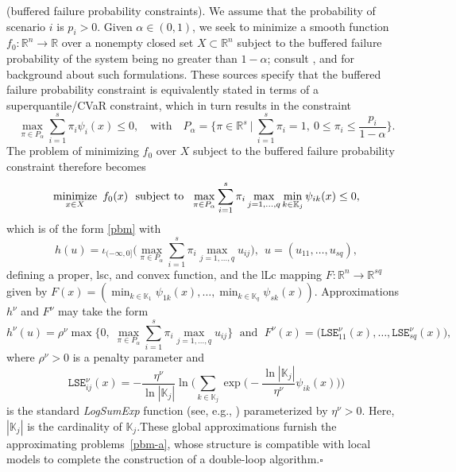 \documentclass[smallextended,envcountsect]{svjour3}
\renewcommand{\Re}{\mathbb{R}}
\newcommand{\mybox}{{\hfill $\square$}}
\newcommand{\reals}{\mathbb{R}}
\newcommand{\nnmin}{\mathop{\rm minimize}}
\begin{document}
\begin{example}{\rm (buffered failure probability constraints).}
We assume that the probability of scenario $i$ is $p_i>0$. Given $\alpha \in (0,1)$, we seek to minimize a smooth function $f_0:\reals^{n}\to \reals$ over a nonempty closed set $X\subset \reals^{n}$ subject to the buffered failure probability of the system being no greater than $1-\alpha$; consult \cite{RockafellarRoyset.10,Royset2025}, and \cite[\S\, 3.E]{Royset_Wets_2021} for background about such formulations. These sources specify that the buffered failure probability constraint is equivalently stated in terms of a superquantile/CVaR constraint, which in turn results in the constraint 
\[
\max_{\pi \in P_\alpha}  \sum_{i = 1}^s \pi_i \psi_i(x)  \leq 0,
\quad \mbox{with} \quad
P_\alpha=\bigg\{\pi\in \Re^s~\bigg|~\sum_{i=1}^s \pi_i=1,~0\leq \pi_i\leq\frac{ p_i}{1-\alpha}\bigg\}.
\] 
The problem of minimizing $f_0$ over $X$ subject to the buffered failure probability constraint therefore becomes
\[
\nnmin_{x\in X} ~ f_0(x) ~\mbox{ subject to } ~ \max_{\pi \in P_\alpha}  \sum_{i = 1}^s \pi_i \max_{j=1, \dots, q} \min_{k \in \mathbb{K}_j} \psi_{ik}(x)  \leq 0,
\]
which is of the form \eqref{pbm} with
\[
h(u) = \iota_{(-\infty,0]}\bigg(\max_{\pi \in P_\alpha}  \sum_{i = 1}^s \pi_i \max_{j=1, \dots, q} u_{ij}\bigg), ~~ u = ( u_{11}, \dots, u_{sq}),
\]
defining a proper, lsc, and convex function, and the lLc mapping $F:\reals^{n} \to \reals^{sq}$ given by $F(x) = (\min_{k \in \mathbb{K}_1} \psi_{1k}(x), \dots, \min_{k \in \mathbb{K}_q} \psi_{sk}(x))$. Approximations $h^\nu$ and $F^\nu$ may take the form 
\[
h^\nu(u)= \rho^\nu\max\bigg\{0,\;\max_{\pi \in P_\alpha}  \sum_{i = 1}^s \pi_i \max_{j=1, \dots, q} u_{ij}\bigg\}\;\mbox{ and }\; 
F^\nu(x)=\big(\texttt{LSE}^\nu_{11}(x), \dots, \texttt{LSE}^\nu_{sq}(x)\big),
\]
where $\rho^\nu>0$ is a penalty parameter and 
\[
\mathtt{LSE}^\nu_{ij}(x)=-\frac{\eta^\nu}{\ln |\mathbb{K}_j|}\ln\Bigg(\sum_{k\in \mathbb{K}_j} \exp\Big(-\frac{\ln |\mathbb{K}_j|}{\eta^\nu} \psi_{ik}(x)\Big)\Bigg)
\]
is the standard \emph{LogSumExp} function (see, e.g., \cite[Examples 4.16, 6.43, and 7.43]{Royset_Wets_2021}) parameterized by $\eta^\nu>0$. Here, $|\mathbb{K}_j|$ is the cardinality of $\mathbb{K}_j$.These global approximations furnish the approximating problems~\eqref{pbm-a}, whose structure is compatible with local models to complete the construction of a double-loop algorithm.\mybox
\end{example}
\end{document}
